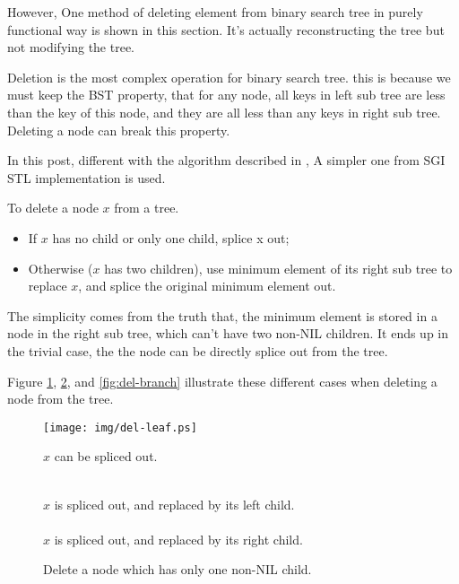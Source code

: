 \documentclass{article}
\begin{document}
However, One method of deleting element from binary search
tree in purely functional way is shown in this section. It's actually
reconstructing the tree but not modifying the tree.

Deletion is the most complex operation for binary search tree.
this is because we must keep the BST property, that for any node,
all keys in left sub tree are less than the key of this node, and
they are all less than any keys in right sub tree. Deleting a node
can break this property.

In this post, different with the algorithm described in \cite{CLRS},
A simpler one from SGI STL implementation is used.\cite{sgi-stl}

To delete a node $x$ from a tree.
\begin{itemize}
\item If $x$ has no child or only one child, splice x out;
\item Otherwise ($x$ has two children), use minimum element of its right sub tree to replace $x$, and splice the original minimum element out.
\end{itemize}

The simplicity comes from the truth that, the minimum element is stored
in a node in the right sub tree, which can't have two non-NIL children.
It ends up in the trivial case, the the node can be directly splice
out from the tree.

Figure \ref{fig:del-leaf}, \ref{fig:del-1child}, and \ref{fig:del-branch}
illustrate these different cases when deleting a node from the tree.

\begin{figure}[htbp]
       \begin{center}
	\texttt{[image: img/del-leaf.ps]}
        \caption{$x$ can be spliced out.} \label{fig:del-leaf}
       \end{center}
\end{figure}

\begin{figure}[htbp]
        \centering
         \\
        $x$ is spliced out, and replaced by its left child. \\
         \\
        $x$ is spliced out, and replaced by its right child.
        \caption{Delete a node which has only one non-NIL child.}
        \label{fig:del-1child}
\end{figure}
\end{document}
